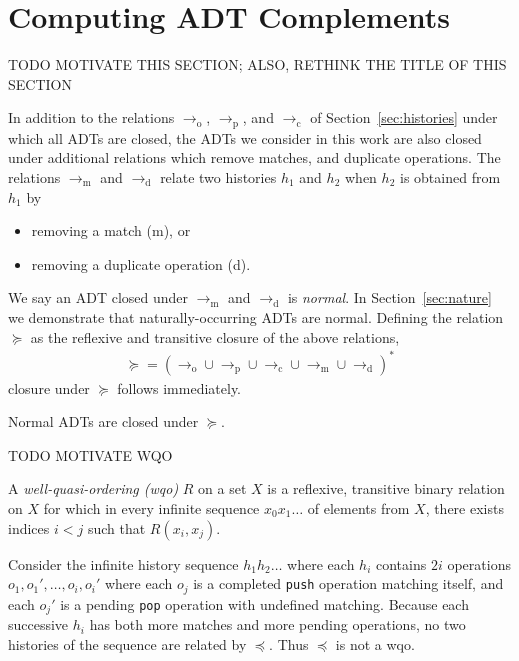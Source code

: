 \section{Computing ADT Complements}
\label{sec:patterns}

TODO MOTIVATE THIS SECTION; ALSO, RETHINK THE TITLE OF THIS SECTION

In addition to the relations $\to_\mathrm{o}$, $\to_\mathrm{p}$, and
$\to_\mathrm{c}$ of Section~\ref{sec:histories} under which all ADTs are
closed, the ADTs we consider in this work are also closed under additional
relations which remove matches, and duplicate operations. The relations
$\to_\mathrm{m}$ and $\to_\mathrm{d}$ relate two histories $h_1$ and $h_2$ when
$h_2$ is obtained from $h_1$ by
\begin{itemize}

  \item removing a match (m), or

  \item removing a duplicate operation (d).

\end{itemize}
We say an ADT closed under $\to_\mathrm{m}$ and $\to_\mathrm{d}$ is
\emph{normal}. In Section~\ref{sec:nature} we demonstrate that
naturally-occurring ADTs are normal. Defining the relation $\succeq$ as the
reflexive and transitive closure of the above relations,
\begin{align*}
  \succeq = (\to_\mathrm{o} \cup \to_\mathrm{p} \cup \to_\mathrm{c} \cup 
  \to_\mathrm{m} \cup \to_\mathrm{d})^\ast
\end{align*}
closure under $\succeq$ follows immediately.

\begin{lemma}

  Normal ADTs are closed under $\succeq$.

\end{lemma}

TODO MOTIVATE WQO

A \emph{well-quasi-ordering (wqo)} $R$ on a set $X$ is a reflexive, transitive
binary relation on $X$ for which in every infinite sequence $x_0 x_1 \ldots$ of
elements from $X$, there exists indices $i < j$ such that $R(x_i,x_j)$.

\begin{example}

  Consider the infinite history sequence $h_1 h_2 \ldots$ where each $h_i$
  contains $2i$ operations $o_1, o_1', \ldots, o_i, o_i'$ where each $o_j$ is a
  completed {\tt push} operation matching itself, and each $o_j'$ is a pending
  {\tt pop} operation with undefined matching. Because each successive $h_i$
  has both more matches and more pending operations, no two histories of the
  sequence are related by $\preceq$. Thus $\preceq$ is not a wqo.

\end{example}

